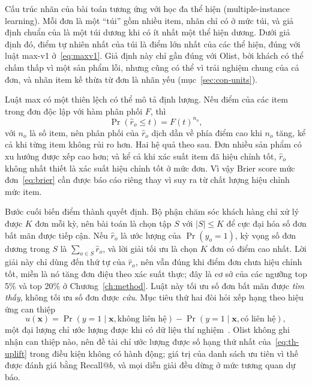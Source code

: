 Cấu trúc nhãn của bài toán tương ứng với học đa thể hiện (multiple-instance learning). Mỗi đơn là một ``túi'' gồm nhiều item, nhãn chỉ có ở mức túi, và giả định chuẩn của \textcite{dietterich1997} là một túi dương khi có ít nhất một thể hiện dương. Dưới giả định đó, điểm tự nhiên nhất của túi là điểm lớn nhất của các thể hiện, đúng với luật max-v1 ở~\eqref{eq:maxv1}. Giả định này chỉ gần đúng với Olist, bởi khách có thể chấm thấp vì một sản phẩm lỗi, nhưng cũng có thể vì trải nghiệm chung của cả đơn, và nhãn item kế thừa từ đơn là nhãn yếu (mục~\ref{sec:con-units}).

Luật max có một thiên lệch có thể mô tả định lượng. Nếu điểm của các item trong đơn độc lập với hàm phân phối $F$, thì
\begin{equation}\label{eq:th-maxbias}
  \Pr\left( \hat{r}_o \le t \right) = F(t)^{n_o},
\end{equation}
với $n_o$ là số item, nên phân phối của $\hat r_o$ dịch dần về phía điểm cao khi $n_o$ tăng, kể cả khi từng item không rủi ro hơn. Hai hệ quả theo sau. Đơn nhiều sản phẩm có xu hướng được xếp cao hơn; và kể cả khi xác suất item đã hiệu chỉnh tốt, $\hat r_o$ không nhất thiết là xác suất hiệu chỉnh tốt ở mức đơn. Vì vậy Brier score mức đơn~\eqref{eq:brier} cần được báo cáo riêng thay vì suy ra từ chất lượng hiệu chỉnh mức item.

Bước cuối biến điểm thành quyết định. Bộ phận chăm sóc khách hàng chỉ xử lý được $K$ đơn mỗi kỳ, nên bài toán là chọn tập $S$ với $|S| \le K$ để cực đại hóa số đơn bất mãn được tiếp cận. Nếu $\hat r_o$ là ước lượng của $\Pr(y_o = 1)$, kỳ vọng số đơn dương trong $S$ là $\sum_{o \in S} \hat r_o$, và lời giải tối ưu là chọn $K$ đơn có điểm cao nhất. Lời giải này chỉ dùng đến thứ tự của $\hat r_o$, nên vẫn đúng khi điểm đơn chưa hiệu chỉnh tốt, miễn là nó tăng đơn điệu theo xác suất thực; đây là cơ sở của các ngưỡng top 5\% và top 20\% ở Chương~\ref{ch:method}. Luật này tối ưu số đơn bất mãn được \emph{tìm thấy}, không tối ưu số đơn được \emph{cứu}. Mục tiêu thứ hai đòi hỏi xếp hạng theo hiệu ứng can thiệp
\begin{equation}\label{eq:th-uplift}
  u(\mathbf{x}) = \Pr\left( y = 1 \mid \mathbf{x}, \text{không liên hệ} \right) - \Pr\left( y = 1 \mid \mathbf{x}, \text{có liên hệ} \right),
\end{equation}
một đại lượng chỉ ước lượng được khi có dữ liệu thí nghiệm~\parencite{ascarza2018,devriendt2021}. Olist không ghi nhận can thiệp nào, nên đề tài chỉ ước lượng được số hạng thứ nhất của~\eqref{eq:th-uplift} trong điều kiện không có hành động; giá trị của danh sách ưu tiên vì thế được đánh giá bằng Recall@$b$, và mọi diễn giải đều dừng ở mức tương quan dự báo.
